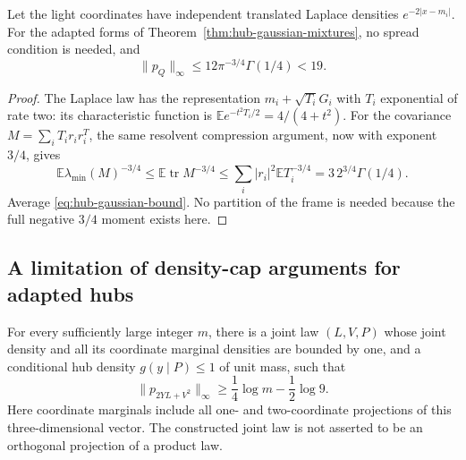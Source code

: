 \begin{corollary}\label{cor:hub-laplace}
Let the light coordinates have independent translated Laplace
densities $e^{-2|x-m_i|}$.  For the adapted forms of
Theorem~\ref{thm:hub-gaussian-mixtures}, no spread condition is needed,
and
\[
 \|p_Q\|_\infty\le12\pi^{-3/4}\Gamma(1/4)<19.
\]
\end{corollary}

\begin{proof}
The Laplace law has the representation
$m_i+\sqrt{T_i}G_i$ with $T_i$ exponential of rate two:
its characteristic function is
$\mathbb E e^{-t^2T_i/2}=4/(4+t^2)$.
For the covariance $M=\sum_iT_i r_i r_i^T$, the same resolvent
compression argument, now with exponent $3/4$, gives
\[
 \mathbb E\lambda_{\min}(M)^{-3/4}
 \le\mathbb E\operatorname{tr}M^{-3/4}
 \le\sum_i|r_i|^2\mathbb ET_i^{-3/4}
 =3\,2^{3/4}\Gamma(1/4).
\]
Average \eqref{eq:hub-gaussian-bound}.  No partition of the frame is
needed because the full negative $3/4$ moment exists here.
\end{proof}

\subsection{A limitation of density-cap arguments for adapted hubs}

\begin{proposition}
\label{prop:hub-cap-obstruction}
For every sufficiently large integer $m$, there is a joint law
$(L,V,P)$ whose joint density and all its coordinate marginal
densities are bounded by one, and a conditional hub density
$g(y\mid P)\le1$ of unit mass, such that
\[
 \|p_{2YL+V^2}\|_\infty\ge\frac14\log m-\frac12\log9.
\]
Here coordinate marginals include all one- and two-coordinate
projections of this three-dimensional vector.  The constructed joint
law is not asserted to be an orthogonal projection of a product law.
\end{proposition}

